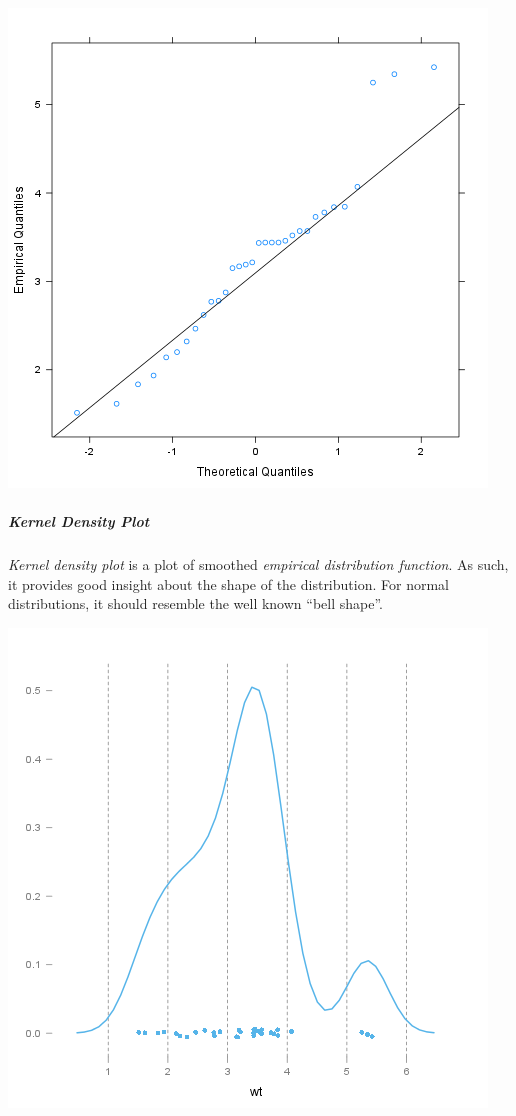 \documentclass[]{article}
\makeatletter
\def\maxwidth{\ifdim\Gin@nat@width>\linewidth\linewidth
\else\Gin@nat@width\fi}
\let\Oldincludegraphics\includegraphics
\renewcommand{\includegraphics}[1]{\Oldincludegraphics[width=\maxwidth]{#1}}
\makeatother
\begin{document}
\href{/tmp/RtmpeIwHkw/file3e388fb3-hires.png}{\includegraphics{975387b3193e28fb08a85f37cb17f87e.png}}

\subparagraph{Kernel Density Plot}

\emph{Kernel density plot} is a plot of smoothed \emph{empirical
distribution function}. As such, it provides good insight about the
shape of the distribution. For normal distributions, it should resemble
the well known ``bell shape''.

\href{/tmp/RtmpeIwHkw/file15a36828-hires.png}{\includegraphics{80be91ef1e8d4bfbd708bf23dc9b14a8.png}}
\end{document}
